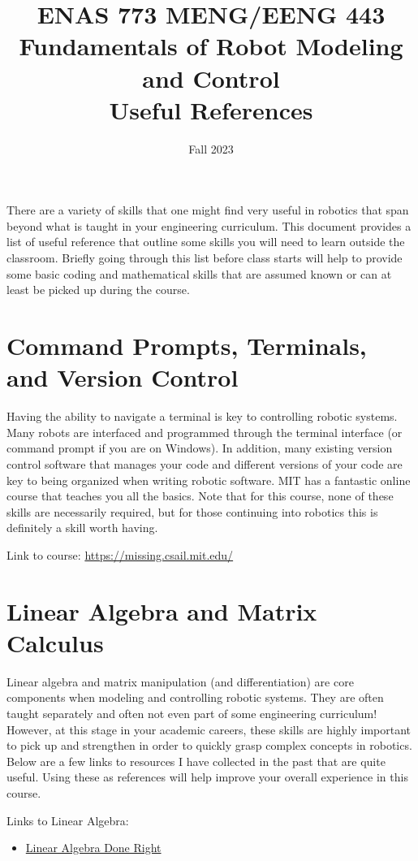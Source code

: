 \documentclass[11pt,letterpaper]{article}
\title{ENAS 773 MENG/EENG 443  \\ Fundamentals of Robot Modeling and Control\\ Useful References}
\author{Fall 2023}
\date{}
\begin{document}
\maketitle

There are a variety of skills that one might find very useful in robotics that span beyond what is taught in your engineering curriculum. This document provides a list of useful reference that outline some skills you will need to learn outside the classroom. Briefly going through this list before class starts will help to provide some basic coding and mathematical skills that are assumed known or can at least be picked up during the course. 

\section*{Command Prompts, Terminals, and Version Control}

Having the ability to navigate a terminal is key to controlling robotic systems. Many robots are interfaced and programmed through the terminal interface (or command prompt if you are on Windows). In addition, many existing version control software that manages your code and different versions of your code are key to being organized when writing robotic software. MIT has a fantastic online course that teaches you all the basics. Note that for this course, none of these skills are necessarily required, but for those continuing into robotics this is definitely a skill worth having. 

Link to course: \href{https://missing.csail.mit.edu/}{https://missing.csail.mit.edu/}

\section*{Linear Algebra and Matrix Calculus} 

Linear algebra and matrix manipulation (and differentiation) are core components when modeling and controlling robotic systems. They are often taught separately and often not even part of some engineering curriculum! However, at this stage in your academic careers, these skills are highly important to pick up and strengthen in order to quickly grasp complex concepts in robotics. Below are a few links to resources I have collected in the past that are quite useful. Using these as references will help improve your overall experience in this course. 

Links to Linear Algebra:
\begin{itemize}
    \item \href{https://apuntespme.cl/biblio/AXLER_LINEARALGEBRA.pdf}{Linear Algebra Done Right}
\end{itemize}
\end{document}
